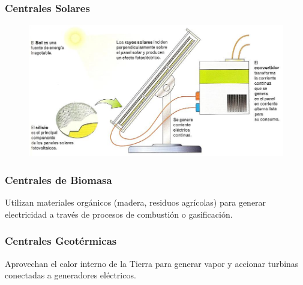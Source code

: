 \documentclass[14pt]{beamer}
\begin{document}
\begin{frame}
\frametitle{Centrales Solares}
\vspace*{-1cm}
\begin{figure}
    \centering
    \includegraphics[scale=0.5]{Imagenes/Planta_Solar_02.jpeg}
\end{figure}
\end{frame}
\begin{frame}
\frametitle{Centrales de Biomasa}
Utilizan materiales orgánicos (madera, residuos agrícolas) para generar electricidad a través de procesos de combustión o gasificación.
\end{frame}
\begin{frame}
\frametitle{Centrales Geotérmicas}
Aprovechan el calor interno de la Tierra para generar vapor y accionar turbinas conectadas a generadores eléctricos.
\end{frame}
\end{document}
